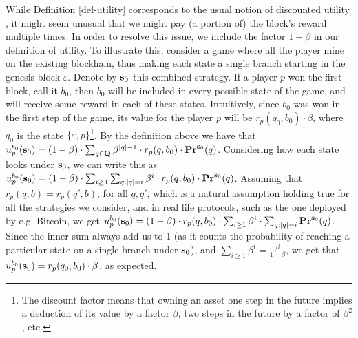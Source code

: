 While Definition \ref{def-utility} corresponds to the usual notion of discounted utility \cite{??}, it might seem unusual that we might pay (a portion of) the block's reward multiple times. In order to resolve this issue, we include the factor $1-\beta$ in our definition of utility. To illustrate this, consider a game where all the player mine on the existing blockhain, thus making each state a single branch starting in the genesis block $\varepsilon$. Denote by $\mathbf{s}_0$ this combined strategy. If a player $p$ won the first block, call it $b_0$, then $b_0$ will be included in every possible state of the game, and will receive some reward in each of these states. Intuitively, since $b_0$ was won in the first step of the game, its value for the player $p$ will be $r_p(q_0,b_0) \cdot \beta$, where $q_0$ is the state $\{\varepsilon,p\}$\footnote{The discount factor means that owning an asset one step in the future implies a deduction of its value by a factor $\beta$, two steps in the future by a factor of $\beta^2$, etc.}. By the definition above we have that $u_p^{b_0}(\mathbf{s}_0) = (1-\beta) \cdot \sum_{q\in \mathbf{Q}} \beta^{|q|-1}\cdot r_p(q,b_0)\cdot \mathbf{Pr}^{\mathbf{s}_0}(q)$. Considering how each state looks under $\mathbf{s}_0$, we can write this as $u_p^{b_0}(\mathbf{s}_0) = (1-\beta)\cdot\sum_{i\geq 1} \sum_{q : |q| = i }\beta^i\cdot r_p(q,b_0)\cdot \mathbf{Pr}^{\mathbf{s}_0}(q)$. Assuming that $r_p(q,b)=r_p(q',b)$, for all $q,q'$, which is a natural assumption holding true for all the strategies we consider, and in real life protocols, such as the one deployed by e.g. Bitcoin, we get $u_p^{b_0}(\mathbf{s}_0) = (1-\beta)\cdot r_p(q,b_0)\cdot \sum_{i\geq 1}\beta^i\cdot \sum_{q : |q| = i } \mathbf{Pr}^{\mathbf{s}_0}(q)$. Since the inner sum always add us to 1 (as it counts the probability of reaching a particular state on a single branch under $\mathbf{s}_0$), and $\sum_{i\geq 1}\beta^i = \frac{\beta}{1-\beta}$, we get that $u_p^{b_0}(\mathbf{s}_0) = r_p(q_0,b_0) \cdot \beta$, as expected.

